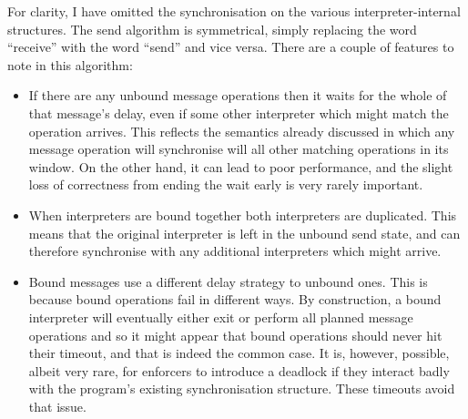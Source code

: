 For clarity, I have omitted the synchronisation on the various
interpreter-internal structures.  The send algorithm is symmetrical,
simply replacing the word ``receive'' with the word ``send'' and vice
versa.  There are a couple of features to note in this algorithm:

\begin{itemize}
\item
  If there are any unbound message operations then it waits for the
  whole of that message's delay, even if some other interpreter which
  might match the operation arrives.  This reflects the semantics
  already discussed in which any message operation will synchronise
  will all other matching operations in its window.  On the other
  hand, it can lead to poor performance, and the slight loss of
  correctness from ending the wait early is very rarely important.
\item
  When interpreters are bound together both interpreters are
  duplicated.  This means that the original interpreter is left in the
  unbound send state, and can therefore synchronise with any
  additional interpreters which might arrive.
\item
  Bound messages use a different delay strategy to unbound ones.  This
  is because bound operations fail in different ways.  By
  construction, a bound interpreter will eventually either exit or
  perform all planned message operations and so it might appear that
  bound operations should never hit their timeout, and that is indeed
  the common case.  It is, however, possible, albeit very rare, for
  {\technique} enforcers to introduce a deadlock if they interact
  badly with the program's existing synchronisation structure.  These
  timeouts avoid that issue.  
\end{itemize}

